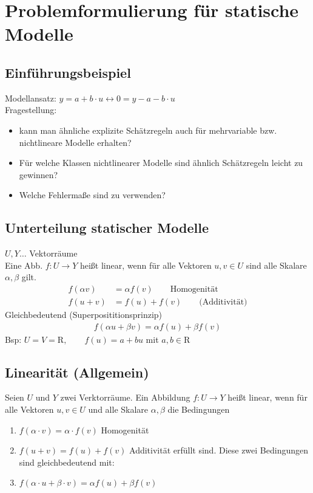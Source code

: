 \documentclass[ngerman]{tudscrreprt}
\begin{document}
\chapter{Problemformulierung für statische Modelle}
	\section{Einf\"uhrungsbeispiel}
	Modellansatz: $y = a+ b\cdot u \leftrightarrow 0=y - a - b\cdot u$\\
	Fragestellung: 
	\begin{itemize}
	\item kann man ähnliche explizite Schätzregeln auch für mehrvariable bzw. nichtlineare Modelle erhalten?
	\item Für welche Klassen nichtlinearer Modelle sind ähnlich Schätzregeln leicht zu gewinnen?
	\item Welche Fehlermaße sind zu verwenden?
	\end{itemize}
	\section{Unterteilung statischer Modelle}
	$U, Y \dots$ Vektorräume \\ 
	Eine Abb. $f: U \to Y $ heißt linear, wenn für alle Vektoren $u, v \in U$ sind alle Skalare $\alpha, \beta$ gilt. \\ 
	\begin{align*}
	f(\alpha v) &= \alpha f(v) \qquad \text{Homogenität}\\ 
	f(u+v) &= f(u) + f(v) \qquad \text{(Additivität)}
	\end{align*}
	Gleichbedeutend (Superposititionsprinzip)\\ 
	\begin{align*}
	f(\alpha u + \beta v) = \alpha f(u) + \beta f(v)
	\end{align*}
	Bsp: $U = V = \mathrm{R} , \qquad f(u) = a + b u $ mit $a,b \in \mathrm{R}$
	\section{Linearit\"at (Allgemein)}
		Seien $U$ und $Y$ zwei Verktorräume. Ein Abbildung $f: U \rightarrow Y $ heißt linear, wenn für alle Vektoren $u, v \in U$ und alle Skalare $\alpha , \beta $ die Bedingungen
			\begin{enumerate}
			\item $f(\alpha \cdot v) = \alpha \cdot f(v)$ Homogenität
			\item $f(u + v) = f(u) + f(v)$ Additivität erfüllt sind. Diese zwei Bedingungen sind gleichbedeutend mit:
			\item $f(\alpha \cdot u + \beta \cdot v) = \alpha f(u) + \beta f(v)$ 
			\end{enumerate}
\end{document}
